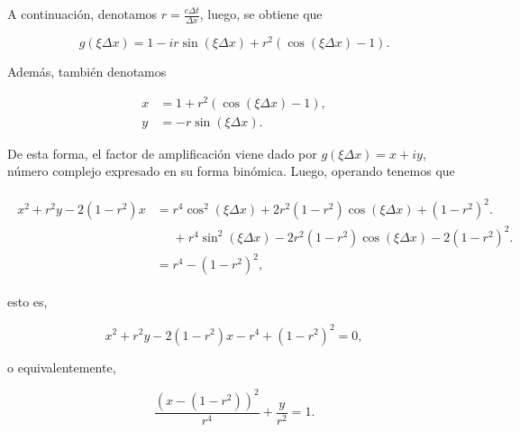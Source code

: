\begin{example}
  A continuación, denotamos
  \begin{math}
    r=
    \frac{c\Delta t}{\Delta x}
  \end{math},
  luego, se obtiene que

  \begin{equation*}
    g
    \left(\xi\Delta x\right)=
    1-ir\sin
    \left(\xi\Delta x\right)+
    r^{2}
    \left(
    \cos
    \left(
      \xi\Delta x
      \right)-1
    \right).
  \end{equation*}

  Además, también denotamos

  \begin{align*}
    x & =
    1+
    r^{2}
    \left(
    \cos\left(\xi \Delta x\right)-
    1
    \right), \\
    y & =
    -r
    \sin
    \left(\xi\Delta x\right).
  \end{align*}

  De esta forma, el factor de amplificación viene dado por
  \begin{math}
    g\left(
    \xi\Delta x
    \right)=
    x+iy
  \end{math},
  número complejo expresado en su forma binómica.
  Luego, operando tenemos que

  \begin{gather*}
    \begin{split}
      x^{2}+
      r^{2}y-
      2\left(1-r^{2}\right)x
       & =
      r^{4}\cos^{2}
      \left(\xi\Delta x\right)+
      2r^{2}
      \left(1-r^{2}\right)
      \cos\left(\xi\Delta x\right)+
      {\left(1-r^{2}\right)}^{2}.  \\
       & \phantom{=}
      +r^{4}
      \sin^{2}
      (\xi \Delta x)-
      2r^{2}
      \left(1-r^{2}\right)
      \cos\left(\xi\Delta x\right)-
      2{\left(1-r^{2}\right)}^{2}. \\
       & =
      r^{4}-
      {\left(1-r^{2}\right)}^{2},
    \end{split}
  \end{gather*}

  esto es,

  \begin{equation*}
    x^{2}+
    r^{2}y-
    2\left(1-r^{2}\right)x-
    r^{4}+
    {\left(1-r^{2}\right)}^{2}=
    0,
  \end{equation*}

  o equivalentemente,

  \begin{equation}\label{eq:ellipse}
    \frac{{\left(x-\left(1-r^{2}\right)\right)}^{2}}{r^{4}}+
    \frac{y}{r^{2}}=
    1.
  \end{equation}


\end{example}
